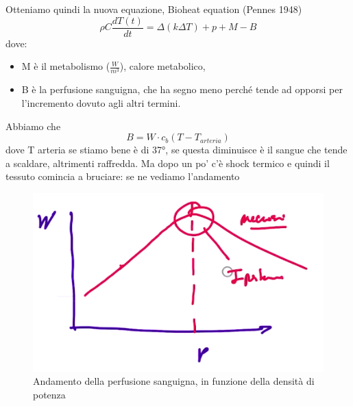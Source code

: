 \documentclass[oneside, 12pt]{extbook}
\begin{document}
Otteniamo quindi la nuova equazione, Bioheat equation (Pennes 1948)
\begin{equation}
	\rho C \frac{dT(t)}{dt} = \Delta (k \Delta T) + p + M - B
\end{equation}
dove: 
\begin{itemize}
	\item M è il metabolismo ($\frac{W}{m^3}$), calore metabolico, \item B è la perfusione sanguigna, che ha segno meno perché tende ad opporsi per l'incremento dovuto agli altri termini.
\end{itemize}
Abbiamo che 
\begin{equation}
	B = W\cdot c_b (T - T_{arteria})
\end{equation}
dove T arteria se stiamo bene è di 37°, se questa diminuisce è il sangue che tende a scaldare, altrimenti raffredda. Ma dopo un po' c'è shock termico e quindi il tessuto comincia a bruciare: se ne vediamo l'andamento
\begin{figure}[!h]
	\includegraphics[scale=0.5]{immagini/andam_perf.png}
	\caption{Andamento della perfusione sanguigna, in funzione della densità di potenza}
\end{figure}
\end{document}
